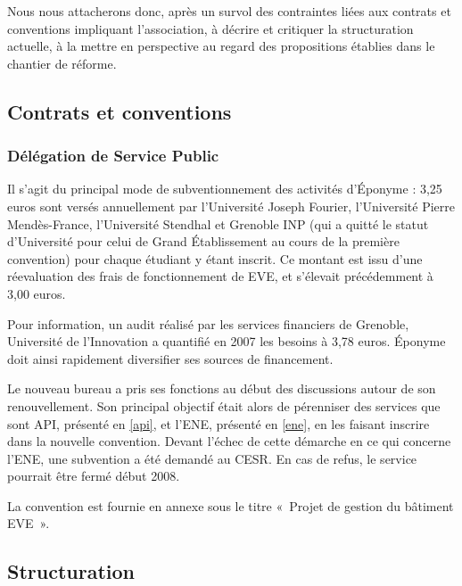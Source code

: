 Nous nous attacherons donc, après un survol des contraintes liées aux contrats
et conventions impliquant l'association, à décrire et critiquer la
structuration actuelle, à la mettre en perspective au regard des propositions
établies dans le chantier de réforme.

\subsection{Contrats et conventions}
\label{contrats}

\subsubsection{Délégation de Service Public}

Il s'agit du principal mode de subventionnement des activités d'Éponyme :
3,25 euros sont versés annuellement par l'Université Joseph Fourier,
l'Université Pierre Mendès-France, l'Université Stendhal et Grenoble INP
(qui a quitté le statut d'Université pour celui de Grand Établissement
 au cours de la première convention) pour chaque étudiant y étant inscrit.
Ce montant est issu d'une réevaluation des frais de fonctionnement de EVE,
et s'élevait précédemment à 3,00 euros.

Pour information, un audit réalisé par les services financiers de Grenoble,
Université de l'Innovation a quantifié en 2007 les besoins à 3,78 euros.
Éponyme doit ainsi rapidement diversifier ses sources de financement.

Le nouveau bureau a pris ses fonctions au début des discussions autour de
son renouvellement. Son principal objectif était alors de pérenniser des
services que sont API, présenté en \ref{api}, et l'ENE, présenté en \ref{ene},
en les faisant inscrire dans la nouvelle
convention. Devant l'échec de cette démarche en ce qui concerne l'ENE, une
subvention a été demandé au CESR. En cas de refus, le service pourrait être
fermé début 2008.

La convention est fournie en annexe sous le titre
«~Projet de gestion du bâtiment EVE~».

\subsection{Structuration}

\label{structuration}
\label{api}
\label{ene}
